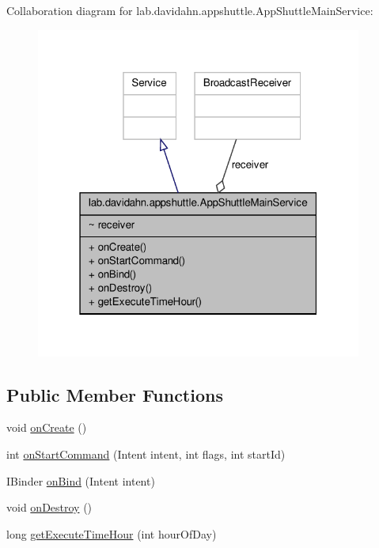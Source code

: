 \-Collaboration diagram for lab.\-davidahn.\-appshuttle.\-App\-Shuttle\-Main\-Service\-:
\nopagebreak
\begin{figure}[H]
\begin{center}
\leavevmode
\includegraphics[width=304pt]{classlab_1_1davidahn_1_1appshuttle_1_1_app_shuttle_main_service__coll__graph}
\end{center}
\end{figure}
\subsection*{\-Public \-Member \-Functions}
\begin{DoxyCompactItemize}
\item 
void \hyperlink{classlab_1_1davidahn_1_1appshuttle_1_1_app_shuttle_main_service_aea9d074d700419b25848ec28d1dc9e4c}{on\-Create} ()
\item 
int \hyperlink{classlab_1_1davidahn_1_1appshuttle_1_1_app_shuttle_main_service_af89c0a8c3c86bbe19b1041305fb449f6}{on\-Start\-Command} (\-Intent intent, int flags, int start\-Id)
\item 
\-I\-Binder \hyperlink{classlab_1_1davidahn_1_1appshuttle_1_1_app_shuttle_main_service_ac87beea9294a9e0124d7159e7afb5476}{on\-Bind} (\-Intent intent)
\item 
void \hyperlink{classlab_1_1davidahn_1_1appshuttle_1_1_app_shuttle_main_service_a1805aab73076743399dc8feda8cc7831}{on\-Destroy} ()
\item 
long \hyperlink{classlab_1_1davidahn_1_1appshuttle_1_1_app_shuttle_main_service_abb9b1b983c7ae8a415d9f22136811bfd}{get\-Execute\-Time\-Hour} (int hour\-Of\-Day)
\end{DoxyCompactItemize}
